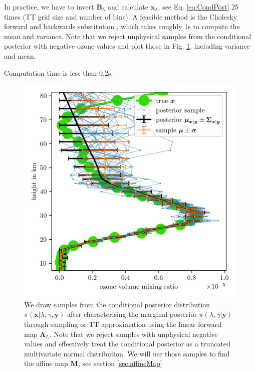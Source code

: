 In practice, we have to invert $\bm{B}_{\lambda} $ and calculate $\bm{x}_{\lambda}$, see Eq. \ref{eq:CondPost} 25 times (TT grid size and number of bins).
A feasible method is the Cholesky forward and backwards substitution \cite{}, which takes roughly $1$s to compute the mean and variance.
Note that we reject unphysical samples from the conditional posterior with negative ozone values and plot those in Fig. \ref{fig:O3Samp}, including variance and mean.

Computation time is less than $0.2$s.
\begin{figure}[ht!]
	\centering
	\includegraphics{FirstTestRes.png}
	\caption[Ozone samples of the conditional posterior.]{We draw samples from the conditional posterior distribution  $\pi(\bm{x}|\lambda,\gamma , \bm{y})$ after characterising the marginal posterior $\pi(\lambda,\gamma | \bm{y})$ through sampling or TT approximation using the linear forward map $\bm{A}_L$. Note that we reject samples with unphysical negative values and effectively treat the conditional posterior as a truncated multivariate normal distribution. We will use those samples to find the affine map $\bm{M}$, see section \ref{sec:affineMap}}
	\label{fig:O3Samp}
\end{figure}

